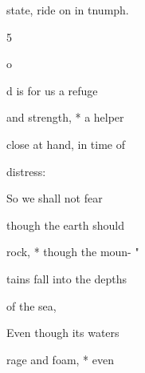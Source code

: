 \documentclass{breviary}
\begin{document}
\begin{brevbody}
%
state, ride on in tnumph.

5

\opening[rubric]{o}{d} is for us a refuge

and strength, * a helper

close at hand, in time of

distress:

So we shall not fear

though the earth should

rock, * though the moun- "

tains fall into the depths

of the sea,

Even though its waters

rage and foam, * even

\end{brevbody}
\end{document}
